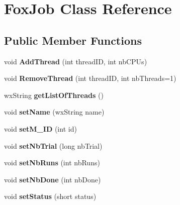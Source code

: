 \hypertarget{class_fox_job}{}\section{Fox\+Job Class Reference}
\label{class_fox_job}
\subsection*{Public Member Functions}
\begin{DoxyCompactItemize}
\item 
\mbox{\label{class_fox_job_a7e5e63996b0456e5a4008cdb3adcfb6a}} 
void {\bfseries Add\+Thread} (int thread\+ID, int nb\+C\+P\+Us)
\item 
\mbox{\label{class_fox_job_a34b23fae77d33d7fc4c126f82e8f2f8d}} 
void {\bfseries Remove\+Thread} (int thread\+ID, int nb\+Threads=1)
\item 
\mbox{\label{class_fox_job_a7ad19195a931d208c7dca3edc8e95161}} 
wx\+String {\bfseries get\+List\+Of\+Threads} ()
\item 
\mbox{\label{class_fox_job_ae7b347f4e82c36e52ef301600e2ebf6c}} 
void {\bfseries set\+Name} (wx\+String name)
\item 
\mbox{\label{class_fox_job_ad14d7eefeee9cad5c6f82db61e1acaf3}} 
void {\bfseries set\+M\+\_\+\+ID} (int id)
\item 
\mbox{\label{class_fox_job_a3f95b936f6fc465ecc5efec9a18e6ab1}} 
void {\bfseries set\+Nb\+Trial} (long nb\+Trial)
\item 
\mbox{\label{class_fox_job_a4871f60881404a757d12c0d505236c48}} 
void {\bfseries set\+Nb\+Runs} (int nb\+Runs)
\item 
\mbox{\label{class_fox_job_af0e2f4561dc3ddc0466e8d1ca950c12a}} 
void {\bfseries set\+Nb\+Done} (int nb\+Done)
\item 
\mbox{\label{class_fox_job_a773d3b71b95024ae16d642a0b81f1d07}} 
void {\bfseries set\+Status} (short status)
\item 
\mbox{\label{class_fox_job_a82446683ff1637051f7643250ec02974}} 

\end{DoxyCompactItemize}
